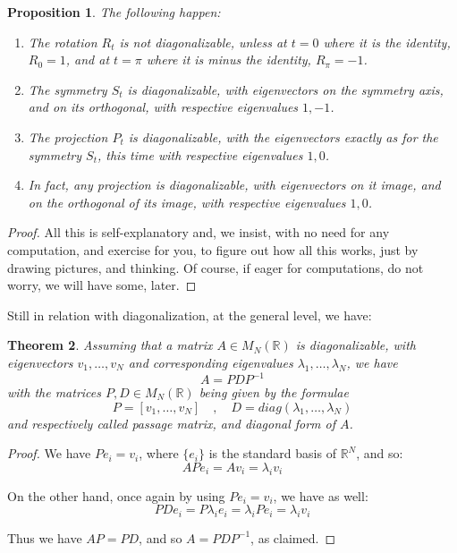 \documentclass[12pt]{amsbook}
\newtheorem{theorem}{Theorem}[chapter]
\newtheorem{proposition}[theorem]{Proposition}
\begin{document}
\begin{proposition}
The following happen:
\begin{enumerate}
\item The rotation $R_t$ is not diagonalizable, unless at $t=0$ where it is the identity, $R_0=1$, and at $t=\pi$ where it is minus the identity, $R_\pi=-1$.

\item The symmetry $S_t$ is diagonalizable, with eigenvectors on the symmetry axis, and on its orthogonal, with respective eigenvalues $1,-1$.

\item The projection $P_t$ is diagonalizable, with the eigenvectors exactly as for the symmetry $S_t$, this time with respective eigenvalues $1,0$.

\item In fact, any projection is diagonalizable, with eigenvectors on it image, and on the orthogonal of its image, with respective eigenvalues $1,0$.
\end{enumerate}
\end{proposition}

\begin{proof}
All this is self-explanatory and, we insist, with no need for any computation, and exercise for you, to figure out how all this works, just by drawing pictures, and thinking. Of course, if eager for computations, do not worry, we will have some, later.
\end{proof}

Still in relation with diagonalization, at the general level, we have:


\begin{theorem}
Assuming that a matrix $A\in M_N(\mathbb R)$ is diagonalizable, with eigenvectors $v_1,\ldots,v_N$ and corresponding eigenvalues $\lambda_1,\ldots,\lambda_N$, we have
$$A=PDP^{-1}$$
with the matrices $P,D\in M_N(\mathbb R)$ being given by the formulae
$$P=[v_1,\ldots,v_N]\quad,\quad 
D=diag(\lambda_1,\ldots,\lambda_N)$$
and respectively called passage matrix, and diagonal form of $A$.
\end{theorem}

\begin{proof}
We have $Pe_i=v_i$, where $\{e_i\}$ is the standard basis of $\mathbb R^N$, and so:
$$APe_i
=Av_i
=\lambda_iv_i$$

On the other hand, once again by using $Pe_i=v_i$, we have as well:
$$PDe_i
=P\lambda_ie_i
=\lambda_iPe_i
=\lambda_iv_i$$

Thus we have $AP=PD$, and so $A=PDP^{-1}$, as claimed.
\end{proof}
\end{document}
